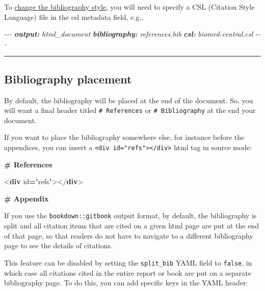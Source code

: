 \documentclass[
  a4paper,
  twoside,
  openright]{book}
\newenvironment{Shaded}{\begin{snugshade}}{\end{snugshade}}
\newcommand{\AnnotationTok}[1]{\textcolor[rgb]{0.56,0.35,0.01}{\textbf{\textit{#1}}}}
\newcommand{\CommentTok}[1]{\textcolor[rgb]{0.56,0.35,0.01}{\textit{#1}}}
\newcommand{\DataTypeTok}[1]{\textcolor[rgb]{0.13,0.29,0.53}{#1}}
\newcommand{\FunctionTok}[1]{\textcolor[rgb]{0.13,0.29,0.53}{\textbf{#1}}}
\newcommand{\KeywordTok}[1]{\textcolor[rgb]{0.13,0.29,0.53}{\textbf{#1}}}
\newcommand{\OperatorTok}[1]{\textcolor[rgb]{0.81,0.36,0.00}{\textbf{#1}}}
\newcommand{\OtherTok}[1]{\textcolor[rgb]{0.56,0.35,0.01}{#1}}
\newcommand{\StringTok}[1]{\textcolor[rgb]{0.31,0.60,0.02}{#1}}
\theoremstyle{definition}
\theoremstyle{definition}
\theoremstyle{definition}
\theoremstyle{definition}
\theoremstyle{remark}
\begin{document}
To \href{https://bookdown.org/yihui/rmarkdown-cookbook/bibliography.html\#changing-citation-style}{change the bibliography style}, you will need to specify a CSL (Citation Style Language) file in the csl metadata field, e.g.,

\begin{Shaded}
\begin{Highlighting}[]
\CommentTok{{-}{-}{-}}
\AnnotationTok{output:}\CommentTok{ html\_document}
\AnnotationTok{bibliography:}\CommentTok{ references.bib  }
\AnnotationTok{csl:}\CommentTok{ biomed{-}central.csl}
\CommentTok{{-}{-}{-}}
\end{Highlighting}
\end{Shaded}

\begin{center}\rule{0.5\linewidth}{0.5pt}\end{center}

\subsection{Bibliography placement}\label{bibliography-placement}

By default, the bibliography will be placed at the end of the document. So, you will want a final header titled \texttt{\#\ References} or \texttt{\#\ Bibliography} at the end your document.

If you want to place the bibliography somewhere else, for instance before the appendices, you can insert a \texttt{\textless{}div\ id="refs"\textgreater{}\textless{}/div\textgreater{}} html tag in source mode:

\begin{Shaded}
\begin{Highlighting}[]
\FunctionTok{\# References}

\DataTypeTok{\textless{}}\KeywordTok{div}\OtherTok{ id}\OperatorTok{=}\StringTok{"refs"}\DataTypeTok{\textgreater{}\textless{}/}\KeywordTok{div}\DataTypeTok{\textgreater{}}

\FunctionTok{\# Appendix}
\end{Highlighting}
\end{Shaded}

If you use the \texttt{bookdown::gitbook} output format, by default, the bibliography is split and all citation items that are cited on a given html page are put at the end of that page, so that readers do not have to navigate to a different bibliography page to see the details of citations.

This feature can be disabled by setting the \texttt{split\_bib} YAML field to \texttt{false}, in which case all citations cited in the entire report or book are put on a separate bibliography page. To do this, you can add specific keys in the YAML header:
\end{document}
